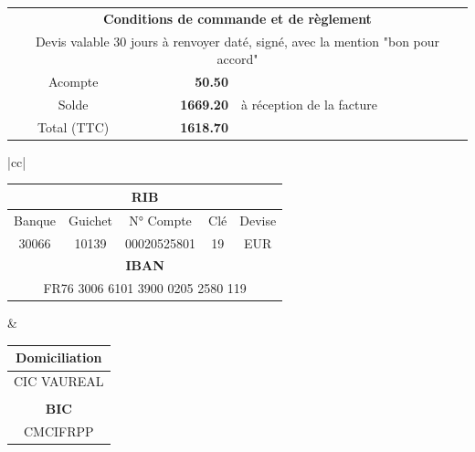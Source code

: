 \documentclass[11pt,french]{article}%
\def\Total{1669.20}%
\def\totalLeft{1618.70}%
\def\deposit{50.50}%
\begin{document}
\vfill
\vfill
\begin{center}
\begin{tabular}{|crl|}
	\hline
	\multicolumn{3}{|c|}{\textbf{Conditions de commande et de règlement}} \\
	\multicolumn{3}{|c|}{Devis valable 30 jours à renvoyer daté, signé, avec la mention "bon pour accord"} \\
	Acompte & \textbf{\deposit \EUR} & \\
	Solde &	\textbf{\Total \EUR} & à réception de la facture \\
	Total (TTC) & \textbf{\totalLeft \EUR} & \\
	\hline
\end{tabular}
\begin{tabular}{|cc|}
	\hline
	\begin{minipage}{10cm}
	\begin{center}
		\begin{tabular}{ccccc}
		 	\multicolumn{5}{c}{\textbf{RIB}} \\
		 	\hline
			Banque & Guichet & N° Compte & Clé & Devise \\
			30066  & 10139 & 00020525801 & 19 & EUR \\ 
			\multicolumn{5}{c}{\textbf{IBAN}} \\
			\hline
			\multicolumn{5}{c}{FR76 3006 6101 3900 0205 2580 119}
		\end{tabular}
	\end{center}
	\end{minipage} &
	\begin{minipage}{7cm}
	\begin{center}
	\begin{tabular}{c}
		\textbf{Domiciliation} \\ \hline
		CIC VAUREAL \\
		\\
		\textbf{BIC} \\ \hline
		CMCIFRPP
	\end{tabular}
	\end{center}
	\end{minipage} \\ \hline \hline


\end{tabular}
\end{center}
\end{document}
